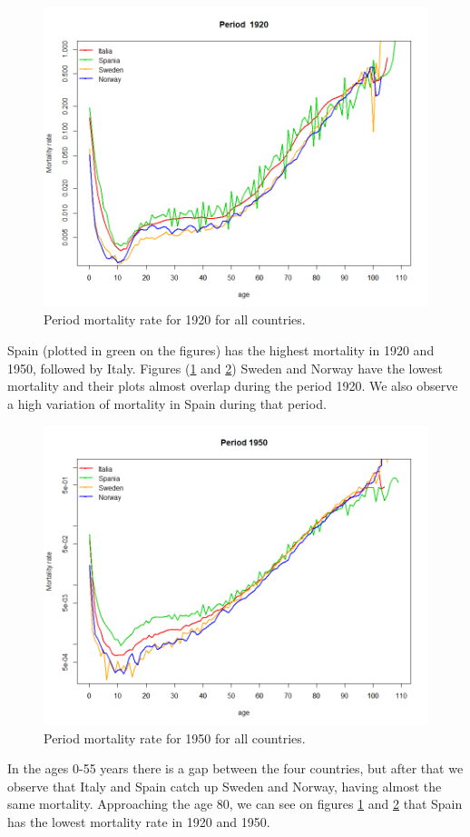             
           \begin{figure}[t]
             \centering
              \includegraphics[width=0.8\linewidth]{figures/periodMortalityRate_allCountries1920.png}
              \caption{Period mortality rate for 1920 for all countries.}
              \label{fig:Period mortalityRate 1920}
            \end{figure} 
            
Spain (plotted in green on the figures)  has the highest mortality in 1920 and 1950, followed by Italy. Figures (\ref{fig:Period mortalityRate 1920} and \ref{fig:Period mortalityRate 1950})  
Sweden and Norway have the lowest mortality and their plots almost overlap during the period 1920.
We also observe a high variation of mortality in Spain during that period.               
            
           \begin{figure}[b]
             \centering
              \includegraphics[width=0.8\linewidth]{figures/periodMortalityRate_allCountries1950.png}
              \caption{Period mortality rate for 1950 for all countries.}
              \label{fig:Period mortalityRate 1950}
            \end{figure} 
In the ages 0-55 years there is a gap between the four countries, but after that we observe that Italy and Spain catch up Sweden and Norway, having almost the same mortality. 
Approaching the age 80, we can see on figures \ref{fig:Period mortalityRate 1920} and \ref{fig:Period mortalityRate 1950} that Spain has the lowest mortality rate in 1920 and 1950.           
            
